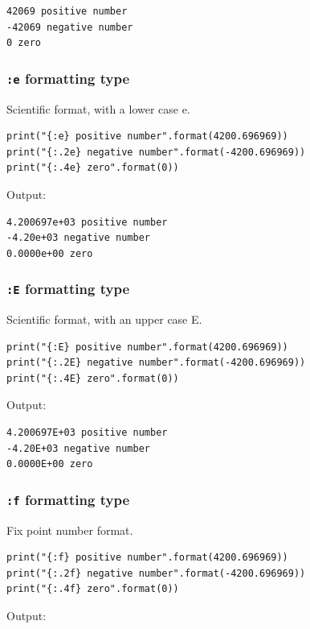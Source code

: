 \documentclass[11pt]{article}
\begin{document}
\begin{verbatim}
42069 positive number
-42069 negative number
0 zero
\end{verbatim}

\subsubsection{\texttt{:e} formatting type}
\label{sec:orgda9e0aa}
Scientific format, with a lower case e.

\begin{verbatim}
print("{:e} positive number".format(4200.696969))
print("{:.2e} negative number".format(-4200.696969))
print("{:.4e} zero".format(0))
\end{verbatim}

 \noindent Output:

\begin{verbatim}
4.200697e+03 positive number
-4.20e+03 negative number
0.0000e+00 zero
\end{verbatim}

\subsubsection{\texttt{:E} formatting type}
\label{sec:org17d7c27}
Scientific format, with an upper case E.

\begin{verbatim}
print("{:E} positive number".format(4200.696969))
print("{:.2E} negative number".format(-4200.696969))
print("{:.4E} zero".format(0))
\end{verbatim}

 \noindent Output:

\begin{verbatim}
4.200697E+03 positive number
-4.20E+03 negative number
0.0000E+00 zero
\end{verbatim}

\subsubsection{\texttt{:f} formatting type}
\label{sec:org733107d}
Fix point number format.

\begin{verbatim}
print("{:f} positive number".format(4200.696969))
print("{:.2f} negative number".format(-4200.696969))
print("{:.4f} zero".format(0))
\end{verbatim}

 \noindent Output:
\end{document}

